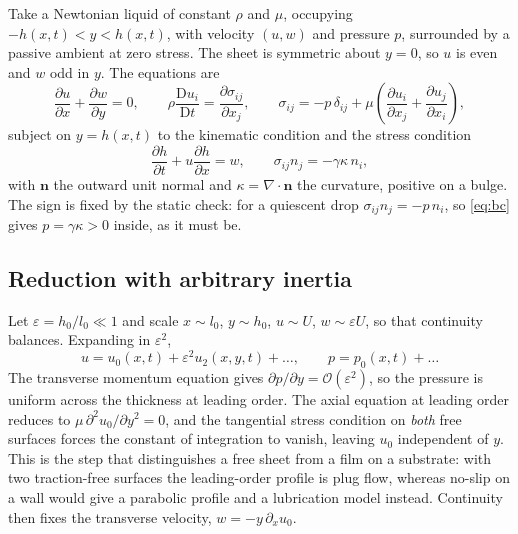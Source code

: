 \documentclass[11pt,a4paper]{article}
\begin{document}
Take a Newtonian liquid of constant $\rho$ and $\mu$, occupying
$-h(x,t) < y < h(x,t)$, with velocity $(u,w)$ and pressure $p$, surrounded by a
passive ambient at zero stress. The sheet is symmetric about $y = 0$, so $u$ is
even and $w$ odd in $y$. The equations are
%
\begin{equation}
  \frac{\partial u}{\partial x} + \frac{\partial w}{\partial y} = 0,
  \qquad
  \rho \frac{\mathrm{D} u_{i}}{\mathrm{D} t}
    = \frac{\partial \sigma_{ij}}{\partial x_{j}},
  \qquad
  \sigma_{ij} = -p\,\delta_{ij} + \mu\left(
    \frac{\partial u_{i}}{\partial x_{j}} + \frac{\partial u_{j}}{\partial x_{i}}
  \right),
  \label{eq:ns}
\end{equation}
%
subject on $y = h(x,t)$ to the kinematic condition and the stress condition
%
\begin{equation}
  \frac{\partial h}{\partial t} + u \frac{\partial h}{\partial x} = w,
  \qquad
  \sigma_{ij} n_{j} = -\gamma \kappa\, n_{i},
  \label{eq:bc}
\end{equation}
%
with $\mathbf{n}$ the outward unit normal and $\kappa = \nabla\!\cdot\!\mathbf{n}$
the curvature, positive on a bulge. The sign is fixed by the static check: for a
quiescent drop $\sigma_{ij}n_{j} = -p\,n_{i}$, so \eqref{eq:bc} gives
$p = \gamma\kappa > 0$ inside, as it must be.

\subsection{Reduction with arbitrary inertia}
\label{sec:inertial}

Let $\varepsilon = h_{0}/l_{0} \ll 1$ and scale $x \sim l_{0}$, $y \sim h_{0}$,
$u \sim U$, $w \sim \varepsilon U$, so that continuity balances. Expanding in
$\varepsilon^{2}$,
%
\begin{equation}
  u = u_{0}(x,t) + \varepsilon^{2} u_{2}(x,y,t) + \dots,
  \qquad
  p = p_{0}(x,t) + \dots
\end{equation}
%
The transverse momentum equation gives $\partial p/\partial y = \mathcal{O}(\varepsilon^{2})$,
so the pressure is uniform across the thickness at leading order. The axial
equation at leading order reduces to $\mu\,\partial^{2}u_{0}/\partial y^{2} = 0$,
and the tangential stress condition on \emph{both} free surfaces forces the
constant of integration to vanish, leaving $u_{0}$ independent of $y$. This is
the step that distinguishes a free sheet from a film on a substrate: with two
traction-free surfaces the leading-order profile is plug flow, whereas no-slip
on a wall would give a parabolic profile and a lubrication model instead.
Continuity then fixes the transverse velocity, $w = -y\,\partial_{x}u_{0}$.
\end{document}
